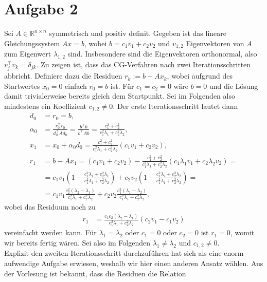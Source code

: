 \documentclass[english, parskip=full]{scrartcl}
\newcommand{\kla}{}
\begin{document}
\newpage
\section*{Aufgabe 2}
Sei $A\in\mathbb{R}^{n\times n}$ symmetrisch und positiv definit.
Gegeben ist das lineare Gleichungssystem $Ax=b$, wobei $b=c_1v_1 + c_2v_2$ und $v_{1,2}$ Eigenvektoren von $A$ zum Eigenwert $\lambda_{1,2}$ sind.
Insbesondere sind die Eigenvektoren orthonormal, also $v_j^\top v_k = \delta_{jk}$.
Zu zeigen ist, dass das CG-Verfahren nach zwei Iterationsschritten abbricht.
Definiere dazu die Residuen $r_k := b- Ax_k$, wobei aufgrund des Startwertes $x_0 = 0$ einfach $r_0 = b$ ist.
Für $c_1=c_2=0$ wäre $b=0$ und die Lösung damit trivialerweise bereits gleich dem Startpunkt.
Sei im Folgenden also mindestens ein Koeffizient $c_{1,2} \neq 0$.
Der erste Iterationsschritt lautet dann
\begin{align}
d_0 &= r_0 = b,\\
\alpha_0 &= \frac{r_0^\top r_0}{d_0^\top Ad_0} = \frac{b^\top b}{b^\top Ab} = \frac{c_1^2 + c_2^2}{c_1^2\lambda_1 + c_2^2\lambda_2},\\
x_1 &= x_0 + \alpha_0 d_0 = \frac{c_1^2 + c_2^2}{c_1^2\lambda_1 + c_2^2\lambda_2}(c_1v_1 + c_2v_2),\\
r_1 &= b - Ax_1 = (c_1v_1 + c_2v_2) - \frac{c_1^2 + c_2^2}{c_1^2\lambda_1 + c_2^2\lambda_2}(c_1\lambda_1 v_1 + c_2\lambda_2 v_2) = \\
&= c_1v_1 \kla\left( 1 - \frac{c_1^2\lambda_1 + c_2^2\lambda_1}{c_1^2\lambda_1 + c_2^2\lambda_2} \right) + c_2v_2 \kla\left( 1 - \frac{c_1^2\lambda_2 + c_2^2\lambda_2}{c_1^2\lambda_1 + c_2^2\lambda_2} \right) =\\
&= c_1v_1 \frac{c_2^2(\lambda_2 - \lambda_1)}{c_1^2\lambda_1 + c_2^2\lambda_2} + c_2v_2 \frac{c_1^2(\lambda_1 - \lambda_2)}{c_1^2\lambda_1 + c_2^2\lambda_2},
\end{align}
wobei das Residuum noch zu 
\begin{align}
r_1 &= \frac{c_1c_2 (\lambda_2 - \lambda_1)}{c_1^2\lambda_1 + c_2^2\lambda_2}\kla\left( c_2v_1 - c_1v_2 \right)
\end{align}
vereinfacht werden kann.
Für $\lambda_1 = \lambda_2$ oder $c_1=0$ oder $c_2 = 0$ ist $r_1=0$, womit wir bereits fertig wären.
Sei also im Folgenden $\lambda_1\neq \lambda_2$ und $c_{1,2}\neq 0$.
\\
Explizit den zweiten Iterationsschritt durchzuführen hat sich als eine enorm aufwendige Aufgabe erwiesen, weshalb wir hier einen anderen Ansatz wählen.
Aus der Vorlesung ist bekannt, dass die Residuen die Relation
\end{document}

